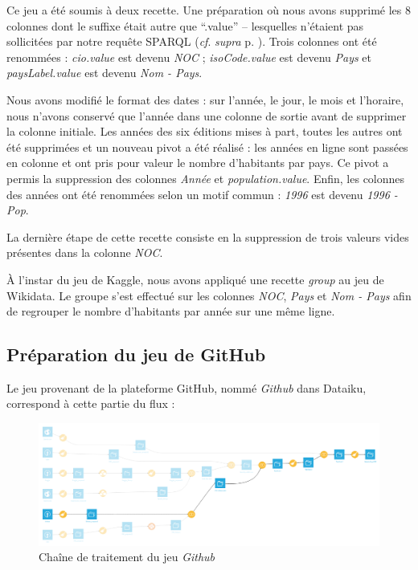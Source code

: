 \documentclass[hidelinks, 12pt]{report}
\begin{document}
Ce jeu a été soumis à deux recette. Une préparation où nous avons supprimé les 8 colonnes dont le suffixe était autre que \enquote{.value} -- lesquelles n'étaient pas sollicitées par notre requête SPARQL (\textit{cf}. \textit{supra} p. \pageref{nongrata}). Trois colonnes ont été renommées : \textit{cio.value} est devenu \textit{NOC} ; \textit{isoCode.value} est devenu \textit{Pays} et \textit{paysLabel.value} est devenu \textit{Nom - Pays}.

Nous avons modifié le format des dates : sur l'année, le jour, le mois et l'horaire, nous n'avons conservé que l'année dans une colonne de sortie avant de supprimer la colonne initiale. Les années des six éditions mises à part, toutes les autres ont été supprimées et un nouveau pivot a été réalisé : les années en ligne sont passées en colonne et ont pris pour valeur le nombre d'habitants par pays. Ce pivot a permis la suppression des colonnes \emph{Année} et \emph{population.value}. Enfin, les colonnes des années ont été renommées selon un motif commun : \emph{1996} est devenu \emph{1996 - Pop}.

La dernière étape de cette recette consiste en la suppression de trois valeurs vides présentes dans la colonne \emph{NOC}.

À l'instar du jeu de Kaggle, nous avons appliqué une recette \emph{group} au jeu de Wikidata. Le groupe s'est effectué sur les colonnes \emph{NOC}, \emph{Pays} et \emph{Nom - Pays} afin de regrouper le nombre d'habitants par année sur une même ligne.





%





\subsection{Préparation du jeu de GitHub}

Le jeu provenant de la plateforme GitHub, nommé \textit{Github} dans Dataiku, correspond à cette partie du flux :

\begin{center}
	\begin{figure}[H]
		\setlength{\belowcaptionskip}{-35pt}
		\includegraphics[scale=0.35]{images/flow-medals-github.png}
		\caption{Chaîne de traitement du jeu \textit{Github}}
	\end{figure}
\end{center}
\end{document}
